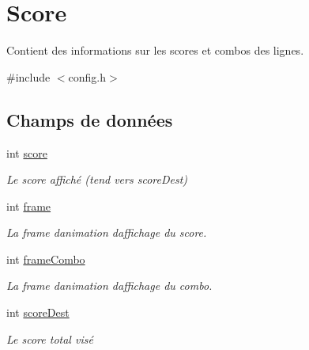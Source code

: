 \hypertarget{structScore}{}\section{Score}
\label{structScore}


Contient des informations sur les scores et combos des lignes.  




{\ttfamily \#include $<$config.\+h$>$}

\subsection*{Champs de données}
\begin{DoxyCompactItemize}
\item 
\mbox{\label{structScore_aef160b7437d94056f1dc59646cd5b87d}} 
int \hyperlink{structScore_aef160b7437d94056f1dc59646cd5b87d}{score}
\begin{DoxyCompactList}\small\item\em Le score affiché (tend vers score\+Dest) \end{DoxyCompactList}\item 
\mbox{\label{structScore_ad30f972f2e6e3e5ecab0dee38ae6cdb8}} 
int \hyperlink{structScore_ad30f972f2e6e3e5ecab0dee38ae6cdb8}{frame}
\begin{DoxyCompactList}\small\item\em La frame d\textquotesingle{}animation d\textquotesingle{}affichage du score. \end{DoxyCompactList}\item 
\mbox{\label{structScore_a721dcecdf6e63772b07dfa9d162ddee9}} 
int \hyperlink{structScore_a721dcecdf6e63772b07dfa9d162ddee9}{frame\+Combo}
\begin{DoxyCompactList}\small\item\em La frame d\textquotesingle{}animation d\textquotesingle{}affichage du combo. \end{DoxyCompactList}\item 
\mbox{\label{structScore_a5905d603da6a493c4dbc8b3f9f1a7673}} 
int \hyperlink{structScore_a5905d603da6a493c4dbc8b3f9f1a7673}{score\+Dest}
\begin{DoxyCompactList}\small\item\em Le score total visé \end{DoxyCompactList}\item 

\end{DoxyCompactItemize}
